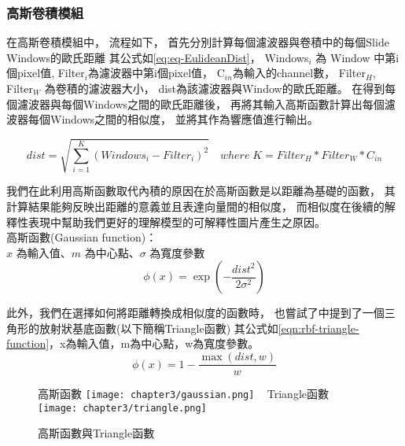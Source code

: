 \documentclass[class=NCU_thesis, crop=false]{standalone}
\begin{document}
		\subsubsection{高斯卷積模組}
			在高斯卷積模組中，
			流程如下，
			首先分別計算每個濾波器與卷積中的每個Slide Windows的歐氏距離
			其公式如\cref{eq:eq-EulideanDist}，
			Windows$_{i}$ 為 Window 中第i個pixel值, 
			Filter$_{i}$為濾波器中第i個pixel值，
			C$_{in}$為輸入的channel數，
			Filter$_{H}$, Filter$_{W}$ 為卷積的濾波器大小，
			dist為該濾波器與Window的歐氏距離。
			在得到每個濾波器與每個Windows之間的歐氏距離後，
			再將其輸入高斯函數計算出每個濾波器每個Windows之間的相似度，
			並將其作為響應值進行輸出。

			\begin{equation}
			    \label{eq:eq-EulideanDist}
			    dist = \sqrt{\sum_{i = 1}^{K} (Windows_{i} - Filter_{i})^{2}} \quad where \; K = Filter_{H} * Filter_{W} * C_{in}
			\end{equation}

				我們在此利用高斯函數取代內積的原因在於高斯函數是以距離為基礎的函數，
			其計算結果能夠反映出距離的意義並且表達向量間的相似度，
			而相似度在後續的解釋性表現中幫助我們更好的理解模型的可解釋性圖片產生之原因。\\
			高斯函數(Gaussian function)：\\
			  $x$ 為輸入值、$m$ 為中心點、$\sigma$ 為寬度參數
			  \begin{equation}
			      \label{eqn:rbf-gaussian-function}
			      \phi (x) = \exp \left( -\frac{dist^2}{2\sigma ^2} \right) 
			  \end{equation}

		  	此外，我們在選擇如何將距離轉換成相似度的函數時，
		  	也嘗試了\cite{YangCNNInterpretable}中提到了一個三角形的放射狀基底函數(以下簡稱Triangle函數)
		  	其公式如\cref{eqn:rbf-triangle-function}，x為輸入值，m為中心點，w為寬度參數。
		  	\begin{equation}
		      \label{eqn:rbf-triangle-function}
		      \phi (x) = 1 - \frac{ \max \left( dist, w \right)}{w}
		  	\end{equation}

		  	\begin{figure}[H]
		    \centering
		    \subcaptionbox
		        {高斯函數
		        \label{fig:gaussian}}
		        {\texttt{[image: chapter3/gaussian.png]}}
		    ~
		    \subcaptionbox
		        {Triangle函數
		        \label{fig:triangle}}
		        {\texttt{[image: chapter3/triangle.png]}}
		    \caption{高斯函數與Triangle函數\cite{YangCNNInterpretable}}
		    \label{fig:rbf}
			\end{figure}
\end{document}
